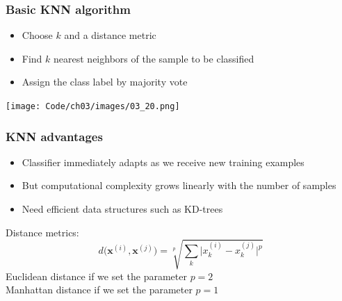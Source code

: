 \documentclass{beamer}
\begin{document}
\begin{frame}
  \frametitle{Basic KNN algorithm}
  \begin{itemize}
  \item Choose $k$ and a distance metric
  \item Find $k$ nearest neighbors of the sample to be classified
  \item Assign the class label by majority vote
  \end{itemize}
\end{frame}

\begin{frame}
  \texttt{[image: Code/ch03/images/03\_20.png]}
\end{frame}

\begin{frame}
  \frametitle{KNN advantages}
  \begin{itemize}
  \item Classifier immediately adapts as we receive new training examples
  \item But computational complexity grows linearly with the number of samples
  \item Need efficient data structures such as KD-trees
  \end{itemize}
  Distance metrics:
  \[
  d \big(\mathbf{x}^{(i)}, \mathbf{x}^{(j)}\big) =  \sqrt[p]{\sum_k \big| x_{k}^{(i)} - x_{k}^{(j)} \big|^p }
  \]
  Euclidean distance if we set the parameter $p=2$ \\
  Manhattan distance if we set the parameter $p=1$
\end{frame}
\end{document}
